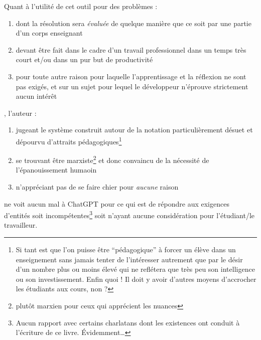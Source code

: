 \documentclass[../../../main.tex]{subfiles}
\begin{document}
Quant à l'utilité de cet outil pour des problèmes :
\begin{enumerate}
\item dont la résolution sera \textit{évaluée} de quelque manière que ce soit par une partie d'un corps enseignant
\item devant être fait dans le cadre d'un travail professionnel dans un temps très court et/ou dans un pur but de productivité
\item pour toute autre raison pour laquelle l'apprentissage et la réflexion ne sont pas exigés, et sur un sujet pour lequel le développeur n'éprouve strictement aucun intérêt
\end{enumerate}
, l'auteur :
\begin{enumerate}
\item jugeant le système construit autour de la notation particulièrement désuet et dépourvu d'attraits pédagogiques\footnote{Si tant est que l'on puisse être ``pédagogique'' à forcer un élève dans un enseignement sans jamais tenter de l'intéresser autrement que par le désir d'un nombre plus ou moins élevé qui ne reflétera que très peu son intelligence ou son investissement. Enfin quoi ! Il doit y avoir d'autres moyens d'accrocher les étudiants aux cours, non ?}
\item se trouvant être marxiste\footnote{plutôt marxien pour ceux qui apprécient les nuances} et donc convaincu de la nécessité de l'épanouissement humaoin
\item n'appréciant pas de se faire chier pour \textit{aucune} raison
\end{enumerate}
ne voit aucun mal à ChatGPT pour ce qui est de répondre aux exigences d'entités soit incompétentes\footnote{Aucun rapport avec certains charlatans dont les existences ont conduit à l'écriture de ce livre. Évidemment\dots} soit n'ayant aucune considération pour l'étudiant/le travailleur.
\end{document}
